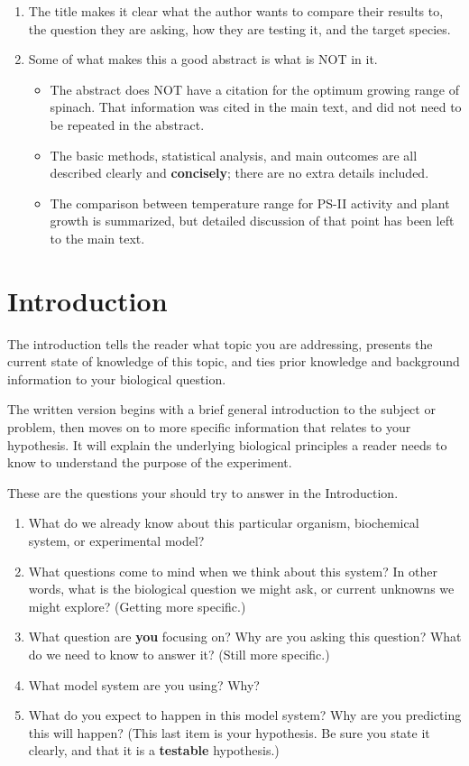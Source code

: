 \documentclass[
]{book}
\providecommand{\tightlist}{%
  \setlength{\itemsep}{0pt}\setlength{\parskip}{0pt}}
\begin{document}
\begin{enumerate}
\def\labelenumi{\arabic{enumi}.}
\tightlist
\item
  The title makes it clear what the author wants to compare their results to, the question they are asking, how they are testing it, and the target species.
\item
  Some of what makes this a good abstract is what is NOT in it.

  \begin{itemize}
  \tightlist
  \item
    The abstract does NOT have a citation for the optimum growing range of spinach. That information was cited in the main text, and did not need to be repeated in the abstract.
  \item
    The basic methods, statistical analysis, and main outcomes are all described clearly and \textbf{concisely}; there are no extra details included.
  \item
    The comparison between temperature range for PS-II activity and plant growth is summarized, but detailed discussion of that point has been left to the main text.
  \end{itemize}
\end{enumerate}

\hypertarget{introduction340}{%
\chapter{Introduction}\label{introduction340}}

The introduction tells the reader what topic you are addressing, presents the current state of knowledge of this topic, and ties prior knowledge and background information to your biological question.

The written version begins with a brief general introduction to the subject or problem, then moves on to more specific information that relates to your hypothesis. It will explain the underlying biological principles a reader needs to know to understand the purpose of the experiment.

These are the questions your should try to answer in the Introduction.

\begin{enumerate}
\def\labelenumi{\arabic{enumi}.}
\tightlist
\item
  What do we already know about this particular organism, biochemical system, or experimental model?
\item
  What questions come to mind when we think about this system? In other words, what is the biological question we might ask, or current unknowns we might explore? (Getting more specific.)
\item
  What question are \textbf{you} focusing on? Why are you asking this question? What do we need to know to answer it? (Still more specific.)
\item
  What model system are you using? Why?
\item
  What do you expect to happen in this model system? Why are you predicting this will happen? (This last item is your hypothesis. Be sure you state it clearly, and that it is a \textbf{testable} hypothesis.)
\end{enumerate}
\end{document}
